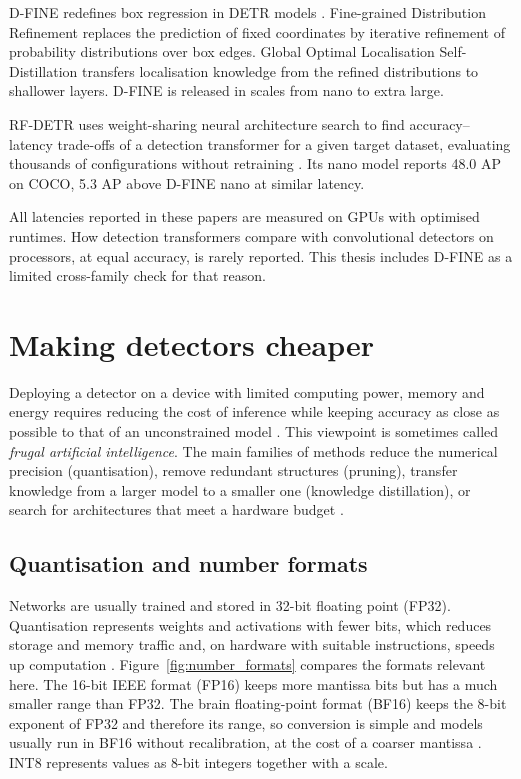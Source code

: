 \documentclass[a4paper,11pt,twoside]{report}
\theoremstyle{definition}
\begin{document}
D-FINE redefines box regression in DETR models \cite{Peng2024DFINE}. Fine-grained Distribution Refinement replaces the prediction of fixed coordinates by iterative refinement of probability distributions over box edges. Global Optimal Localisation Self-Distillation transfers localisation knowledge from the refined distributions to shallower layers. D-FINE is released in scales from nano to extra large.

RF-DETR uses weight-sharing neural architecture search to find accuracy--latency trade-offs of a detection transformer for a given target dataset, evaluating thousands of configurations without retraining \cite{Robinson2025RFDETR}. Its nano model reports 48.0 AP on COCO, 5.3 AP above D-FINE nano at similar latency.

All latencies reported in these papers are measured on GPUs with optimised runtimes. How detection transformers compare with convolutional detectors on processors, at equal accuracy, is rarely reported. This thesis includes D-FINE as a limited cross-family check for that reason.

\section{Making detectors cheaper}
\label{sec:rw_efficiency}

Deploying a detector on a device with limited computing power, memory and energy requires reducing the cost of inference while keeping accuracy as close as possible to that of an unconstrained model \cite{Cheng2017SurveyCompression, Sze2017EfficientProcessing}. This viewpoint is sometimes called \emph{frugal artificial intelligence}. The main families of methods reduce the numerical precision (quantisation), remove redundant structures (pruning), transfer knowledge from a larger model to a smaller one (knowledge distillation), or search for architectures that meet a hardware budget \cite{Gholami2021SurveyQuantization, Han2016DeepCompression, Hinton2015Distilling, Cai2019ProxylessNAS}.

\subsection{Quantisation and number formats}
\label{sec:rw_quantisation}

Networks are usually trained and stored in 32-bit floating point (FP32). Quantisation represents weights and activations with fewer bits, which reduces storage and memory traffic and, on hardware with suitable instructions, speeds up computation \cite{Gholami2021SurveyQuantization, Sze2017EfficientProcessing}. Figure~\ref{fig:number_formats} compares the formats relevant here. The 16-bit IEEE format (FP16) keeps more mantissa bits but has a much smaller range than FP32. The brain floating-point format (BF16) keeps the 8-bit exponent of FP32 and therefore its range, so conversion is simple and models usually run in BF16 without recalibration, at the cost of a coarser mantissa \cite{Kalamkar2019BF16}. INT8 represents values as 8-bit integers together with a scale.
\end{document}
